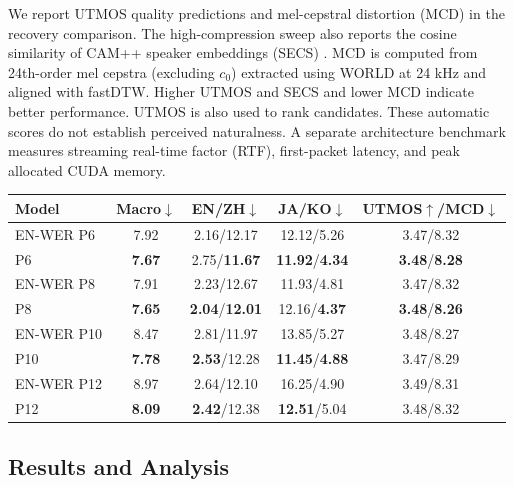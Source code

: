 \documentclass{article}
\begin{document}
We report UTMOS quality predictions \cite{saeki2022utmos} and
mel-cepstral distortion (MCD) in the recovery comparison. The
high-compression sweep also reports the cosine similarity of CAM++
speaker embeddings (SECS) \cite{wang2023campp}. MCD is computed from
24th-order mel cepstra (excluding $c_0$) extracted using WORLD at
24 kHz and aligned with fastDTW. Higher UTMOS and SECS and lower
MCD indicate better performance. UTMOS is also used to rank candidates.
These automatic scores do not establish perceived naturalness.
A separate architecture benchmark measures
streaming real-time factor (RTF), first-packet latency, and peak allocated CUDA memory.

\par\smallskip
\noindent\begin{minipage}{\columnwidth}
\centering
{}
\label{tab:criterion_comparison}
\small
\setlength{\tabcolsep}{1.0pt}
\renewcommand{\arraystretch}{1.05}
\begin{tabular}{lcccc}
\toprule
\textbf{Model} &
\textbf{Macro$\downarrow$} &
\textbf{EN/ZH$\downarrow$} &
\textbf{JA/KO$\downarrow$} &
\textbf{UTMOS$\uparrow$/MCD$\downarrow$} \\
\midrule
EN-WER P6 & 7.92 & 2.16/12.17 & 12.12/5.26 & 3.47/8.32 \\
P6 & \textbf{7.67} & 2.75/\textbf{11.67} & \textbf{11.92}/\textbf{4.34} & \textbf{3.48}/\textbf{8.28} \\
EN-WER P8 & 7.91 & 2.23/12.67 & 11.93/4.81 & 3.47/8.32 \\
P8 & \textbf{7.65} & \textbf{2.04}/\textbf{12.01} & 12.16/\textbf{4.37} & \textbf{3.48}/\textbf{8.26} \\
EN-WER P10 & 8.47 & 2.81/11.97 & 13.85/5.27 & 3.48/8.27 \\
P10 & \textbf{7.78} & \textbf{2.53}/12.28 & \textbf{11.45}/\textbf{4.88} & 3.47/8.29 \\
EN-WER P12 & 8.97 & 2.64/12.10 & 16.25/4.90 & 3.49/8.31 \\
P12 & \textbf{8.09} & \textbf{2.42}/12.38 & \textbf{12.51}/5.04 & 3.48/8.32 \\
\bottomrule
\end{tabular}%
\end{minipage}\par\smallskip

\subsection{Results and Analysis}
\label{sec:results}
\end{document}
